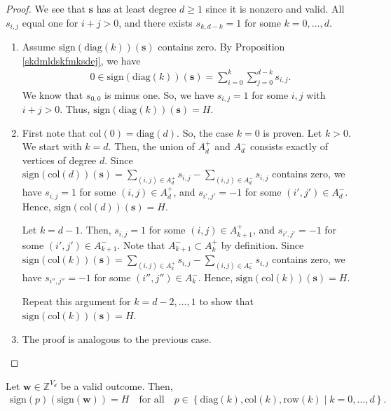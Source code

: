 \begin{proof}
    We see that \( \mathbf{s} \) has at least degree \( d \geq 1 \) since it is nonzero and valid. All \( s_{i,j} \) equal one for \( i + j > 0 \), and there exists \( s_{k, d-k} = 1 \) for some \( k = 0, \dots, d \).

    \begin{enumerate}
        \item Assume \( \mathrm{sign}(\mathrm{diag}(k))(\mathbf{s}) \) contains zero. By Proposition \ref{skdmldskfmksdej}, we have
        \begin{align*}
            0 \in \mathrm{sign}(\mathrm{diag}(k))(\mathbf{s}) = \sum_{i=0}^k \sum_{j=0}^{d-k} s_{i,j}.
        \end{align*}
        We know that \( s_{0,0} \) is minus one. So, we have \( s_{i,j} = 1 \) for some \( i,j \) with \( i + j > 0 \). Thus, \( \mathrm{sign}(\mathrm{diag}(k))(\mathbf{s}) = H \).
        
        \item First note that \( \mathrm{col}(0) = \mathrm{diag}(d) \). So, the case \( k = 0 \) is proven. Let \( k > 0 \). We start with \( k = d \). Then, the union of \( A^+_d \) and \( A^-_d \) consists exactly of vertices of degree \( d \). Since \( \mathrm{sign}(\mathrm{col}(d))(\mathbf{s}) =  \sum_{(i,j) \in A_d^+} s_{i,j} - \sum_{(i,j) \in A_d^-} s_{i,j} \) contains zero, we have \( s_{i,j} = 1 \) for some \( (i,j) \in A_d^+ \), and \( s_{i',j'} = -1 \) for some \( (i',j') \in A_d^- \). Hence, \( \mathrm{sign}(\mathrm{col}(d))(\mathbf{s}) = H \).
        
        Let \( k = d-1 \). Then, \( s_{i,j} = 1 \) for some \( (i,j) \in A_{k+1}^+ \), and \( s_{i',j'} = -1 \) for some \( (i',j') \in A_{k+1}^- \). Note that \( A_{k+1}^- \subset A^+_{k} \) by definition. Since \( \mathrm{sign}(\mathrm{col}(k))(\mathbf{s}) =  \sum_{(i,j) \in A_k^+} s_{i,j} - \sum_{(i,j) \in A_k^-} s_{i,j} \) contains zero, we have \( s_{i'',j''} = -1 \) for some \( (i'',j'') \in A_{k}^- \). Hence, \( \mathrm{sign}(\mathrm{col}(k))(\mathbf{s}) = H \).

        Repeat this argument for \( k = d-2, \dots, 1 \) to show that \( \mathrm{sign}(\mathrm{col}(k))(\mathbf{s}) = H \).

        \item The proof is analogous to the previous case.
    \end{enumerate}
\end{proof}

\begin{corollary}\label{cor:sign-sikjsfnfnuuusus}
    Let \( \mathbf{w} \in \mathbb{Z}^{V_d} \) be a valid outcome. Then, 
    \begin{align*}
        \mathrm{sign}(p)(\mathrm{sign}(\mathbf{w})) = H \quad \text{for all} \quad p \in \left\{ \mathrm{diag}(k), \mathrm{col}(k), \mathrm{row}(k) \mid k = 0, \dots, d \right\}.
    \end{align*}
\end{corollary}

